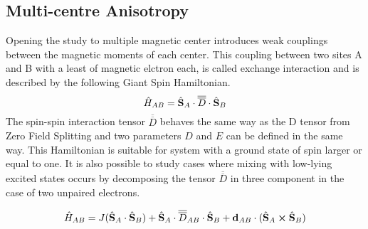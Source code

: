 \documentclass[12pt]{article}
\numberwithin{equation}{section}
\begin{document}
\subsection{Multi-centre Anisotropy}
Opening the study to multiple magnetic center introduces weak couplings between the magnetic moments of each center. 
This coupling between two sites A and B with a least of magnetic elctron each, is called exchange interaction and is described by the following Giant Spin Hamiltonian.
\begin{equation}
    \hat{H}_{AB}=\hat{\vb S}_A\cdot \overline{\overline{D}} \cdot \hat{\vb S}_B
\end{equation}
The spin-spin interaction tensor $\overline{\overline{D}}$ behaves the same way as the D tensor from Zero Field Splitting and two parameters $D$ and $E$ can be defined in the same way. 
This Hamiltonian is suitable for system with a ground state of spin larger or equal to one.
It is also possible to study cases where mixing with low-lying excited states occurs by decomposing the tensor $\overline{\overline{D}}$ in three component in the case of two unpaired electrons.

\begin{equation}
    \hat{H}_{AB}=J(\hat{\vb S}_A \cdot \hat{\vb S}_B) + \hat{\vb S}_A \cdot\overline{\overline{D}}_{AB} \cdot \hat{\vb S}_B + \vb{d}_{AB} \cdot (\hat{\vb S}_A \cross \hat{\vb S}_B)
\end{equation}
\end{document}
